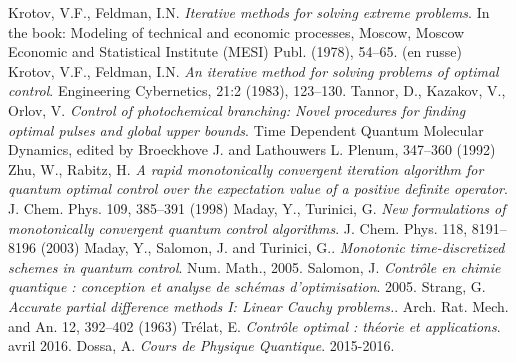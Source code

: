 

\begin{thebibliography}{KNU90}
 Krotov, V.F., Feldman, I.N.
\emph{Iterative methods for solving extreme problems}. In the
book: Modeling of technical and economic processes, Moscow, Moscow Economic and Statistical Institute (MESI) Publ. (1978), 54–65. (en russe)
\vspace{0.5cm}
 Krotov, V.F., Feldman, I.N.
\emph{An iterative method for solving problems of optimal control}. Engineering Cybernetics, 21:2 (1983), 123–130.
\vspace{0.5cm}
 Tannor, D., Kazakov, V., Orlov, V.
\emph{Control of photochemical branching: Novel procedures for finding optimal pulses and global upper bounds}. Time Dependent Quantum Molecular Dynamics, edited by Broeckhove J. and Lathouwers L. Plenum, 347–360 (1992)
\vspace{0.5cm}
 Zhu, W., Rabitz, H.
\emph{A rapid monotonically convergent iteration algorithm for quantum optimal control over the expectation value of a positive definite operator}. J. Chem. Phys. 109, 385–391 (1998)
\vspace{0.5cm}
 Maday, Y., Turinici, G. 
\emph{New formulations of monotonically convergent quantum control algorithms}. J. Chem. Phys. 118, 8191–8196 (2003)
\vspace{0.5cm}
 Maday, Y., Salomon, J. and Turinici, G..
\emph{Monotonic time-discretized schemes in quantum control}. Num. Math., 2005.
\vspace{0.5cm}
 Salomon, J.
\emph{Contrôle en chimie quantique : conception et analyse de schémas d’optimisation}. 2005.
\vspace{0.5cm}
 Strang, G. 
\emph{Accurate partial difference methods I: Linear Cauchy problems.}. Arch. Rat. Mech. and An. 12, 392–402 (1963)
\vspace{0.5cm}
 Trélat, E.
\emph{Contrôle optimal : théorie et applications}. avril 2016.
\vspace{0.5cm}
 Dossa, A.
\emph{Cours de Physique Quantique}. 2015-2016.
\end{thebibliography}